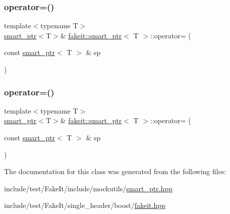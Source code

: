 \subsubsection{\texorpdfstring{operator=()}{operator=()}\hspace{0.1cm}{\footnotesize\ttfamily [8/9]}}
{\footnotesize\ttfamily template$<$typename T$>$ \\
\mbox{\hyperlink{classfakeit_1_1smart__ptr}{smart\+\_\+ptr}}$<$T$>$\& \mbox{\hyperlink{classfakeit_1_1smart__ptr}{fakeit\+::smart\+\_\+ptr}}$<$ T $>$\+::operator= (\begin{DoxyParamCaption}\item[{const \mbox{\hyperlink{classfakeit_1_1smart__ptr}{smart\+\_\+ptr}}$<$ T $>$ \&}]{sp }\end{DoxyParamCaption})\hspace{0.3cm}{\ttfamily [inline]}}

\mbox{\label{classfakeit_1_1smart__ptr_a76edf2172f564378c77dc88a419f6634}} 
\subsubsection{\texorpdfstring{operator=()}{operator=()}\hspace{0.1cm}{\footnotesize\ttfamily [9/9]}}
{\footnotesize\ttfamily template$<$typename T$>$ \\
\mbox{\hyperlink{classfakeit_1_1smart__ptr}{smart\+\_\+ptr}}$<$T$>$\& \mbox{\hyperlink{classfakeit_1_1smart__ptr}{fakeit\+::smart\+\_\+ptr}}$<$ T $>$\+::operator= (\begin{DoxyParamCaption}\item[{const \mbox{\hyperlink{classfakeit_1_1smart__ptr}{smart\+\_\+ptr}}$<$ T $>$ \&}]{sp }\end{DoxyParamCaption})\hspace{0.3cm}{\ttfamily [inline]}}



The documentation for this class was generated from the following files\+:\begin{DoxyCompactItemize}
\item 
include/test/\+Fake\+It/include/mockutils/\mbox{\hyperlink{smart__ptr_8hpp}{smart\+\_\+ptr.\+hpp}}\item 
include/test/\+Fake\+It/single\+\_\+header/boost/\mbox{\hyperlink{single__header_2boost_2fakeit_8hpp}{fakeit.\+hpp}}\end{DoxyCompactItemize}
